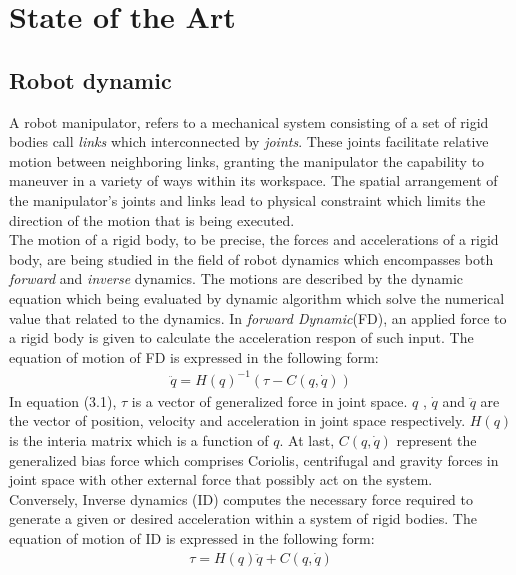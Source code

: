 \documentclass[report.tex]{subfiles}
\begin{document}
    \chapter{State of the Art}
    \label{State of the Art}
    \section{Robot dynamic}
    \noindent A robot manipulator, refers to a mechanical system consisting of a set of rigid bodies call \textit{links} which interconnected by \textit{joints}. These joints facilitate relative motion between neighboring links, granting the manipulator the capability to maneuver in a variety of ways within its workspace. The spatial arrangement of the manipulator's joints and links lead to physical constraint which limits the direction of the motion that is being executed.\\
    The motion of a rigid body, to be precise, the forces and accelerations of a rigid body, are being studied in the field of robot dynamics which encompasses both \textit{forward} and \textit{inverse} dynamics. The motions are described by the dynamic equation which being evaluated by dynamic algorithm which solve the numerical value that related to the dynamics\cite{featherstone2007book}.
    In \textit{forward Dynamic}(FD), an applied force to a rigid body is given to calculate the acceleration respon of such input\cite{featherstone2007book}. The equation of motion of FD is expressed in the following form:
    \begin{align}
            \ddot{q} = H(q)^{-1}(\tau - C(q,\dot{q}))
    \end{align}
    In equation (3.1), $\tau$ is a vector of generalized force in joint space. $q$ , $\dot{q}$ and $\ddot{q}$ are the vector of position, velocity and acceleration in joint space respectively. $H(q)$ is the interia matrix which is a function of $q$. At last, $C(q,\dot{q})$ represent the generalized bias force which comprises Coriolis, centrifugal and gravity forces in joint space with other external force that possibly act on the system\cite{featherstone2007book}.\\
    Conversely, Inverse dynamics (ID) computes the necessary force required to generate a given or desired acceleration within a system of rigid bodies. The equation of motion of ID is expressed in the following form\cite{featherstone2007book}:
    \begin{align}
        \tau  = H(q)\ddot{q}+ C(q,\dot{q})
    \end{align}
\end{document}
